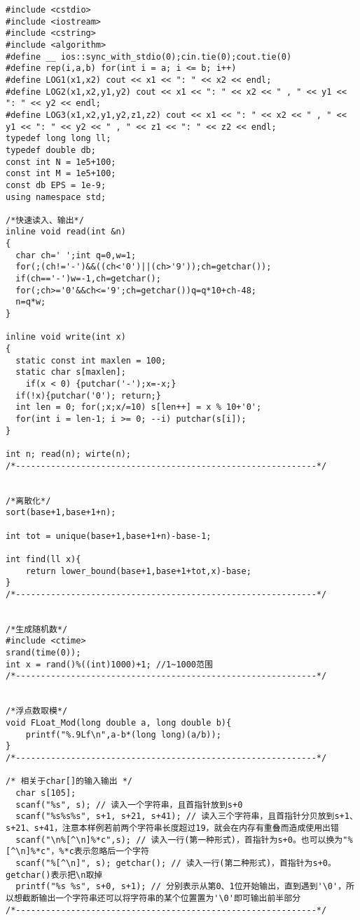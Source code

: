 \documentclass[twoside]{article}
\begin{document}
\begin{lstlisting}
#include <cstdio>
#include <iostream>
#include <cstring>
#include <algorithm>
#define __ ios::sync_with_stdio(0);cin.tie(0);cout.tie(0)
#define rep(i,a,b) for(int i = a; i <= b; i++)
#define LOG1(x1,x2) cout << x1 << ": " << x2 << endl;
#define LOG2(x1,x2,y1,y2) cout << x1 << ": " << x2 << " , " << y1 << ": " << y2 << endl;
#define LOG3(x1,x2,y1,y2,z1,z2) cout << x1 << ": " << x2 << " , " << y1 << ": " << y2 << " , " << z1 << ": " << z2 << endl;
typedef long long ll;
typedef double db;
const int N = 1e5+100;
const int M = 1e5+100;
const db EPS = 1e-9;
using namespace std;

/*快速读入、输出*/
inline void read(int &n)
{
  char ch=' ';int q=0,w=1;
  for(;(ch!='-')&&((ch<'0')||(ch>'9'));ch=getchar());
  if(ch=='-')w=-1,ch=getchar();
  for(;ch>='0'&&ch<='9';ch=getchar())q=q*10+ch-48;
  n=q*w;
}

inline void write(int x)
{
  static const int maxlen = 100;
  static char s[maxlen];
    if(x < 0) {putchar('-');x=-x;}
  if(!x){putchar('0'); return;}
  int len = 0; for(;x;x/=10) s[len++] = x % 10+'0';
  for(int i = len-1; i >= 0; --i) putchar(s[i]);
}

int n; read(n); wirte(n);
/*------------------------------------------------------------*/


/*离散化*/
sort(base+1,base+1+n);

int tot = unique(base+1,base+1+n)-base-1;

int find(ll x){
	return lower_bound(base+1,base+1+tot,x)-base;
}
/*------------------------------------------------------------*/


/*生成随机数*/
#include <ctime>
srand(time(0));
int x = rand()%((int)1000)+1; //1~1000范围
/*------------------------------------------------------------*/


/*浮点数取模*/
void FLoat_Mod(long double a, long double b){
	printf("%.9Lf\n",a-b*(long long)(a/b));
}
/*------------------------------------------------------------*/

/* 相关于char[]的输入输出 */
  char s[105];
  scanf("%s", s); // 读入一个字符串，且首指针放到s+0
  scanf("%s%s%s", s+1, s+21, s+41); // 读入三个字符串，且首指针分贝放到s+1、s+21、s+41，注意本样例若前两个字符串长度超过19，就会在内存有重叠而造成使用出错
  scanf("\n%[^\n]%*c",s); // 读入一行(第一种形式)，首指针为s+0。也可以换为"%[^\n]%*c"，%*c表示忽略后一个字符
  scanf("%[^\n]", s); getchar(); // 读入一行(第二种形式)，首指针为s+0。getchar()表示把\n取掉
  printf("%s %s", s+0, s+1); // 分别表示从第0、1位开始输出，直到遇到'\0'，所以想截断输出一个字符串还可以将字符串的某个位置置为'\0'即可输出前半部分
/*------------------------------------------------------------*/



\end{lstlisting}
\end{document}
